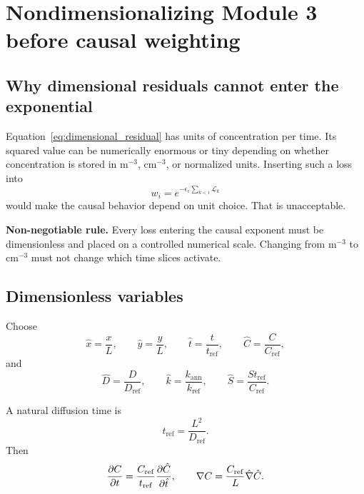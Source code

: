 \documentclass[11pt]{article}
\newcommand{\Dref}{D_{\mathrm{ref}}}
\newcommand{\kref}{k_{\mathrm{ref}}}
\newcommand{\Cref}{C_{\mathrm{ref}}}
\newcommand{\tref}{t_{\mathrm{ref}}}
\newcommand{\epsc}{\epsilon_{\mathrm{c}}}
\begin{document}
\section{Nondimensionalizing Module 3 before causal weighting}

\subsection{Why dimensional residuals cannot enter the exponential}

Equation~\eqref{eq:dimensional_residual} has units of concentration per time. Its squared value can be numerically enormous or tiny depending on whether concentration is stored in m$^{-3}$, cm$^{-3}$, or normalized units. Inserting such a loss into
\begin{equation}
w_i=e^{-\epsc\sum_{k<i}\mathcal{L}_k}
\end{equation}
would make the causal behavior depend on unit choice. That is unacceptable.

\begin{physicsbox}
\textbf{Non-negotiable rule.} Every loss entering the causal exponent must be dimensionless and placed on a controlled numerical scale. Changing from m$^{-3}$ to cm$^{-3}$ must not change which time slices activate.
\end{physicsbox}

\subsection{Dimensionless variables}

Choose
\begin{equation}
\hat{x}=\frac{x}{L},
\qquad
\hat{y}=\frac{y}{L},
\qquad
\hat{t}=\frac{t}{\tref},
\qquad
\hat{C}=\frac{C}{\Cref},
\end{equation}
and
\begin{equation}
\hat{D}=\frac{D}{\Dref},
\qquad
\hat{k}=\frac{k_{\mathrm{ann}}}{\kref},
\qquad
\hat{S}=\frac{S\tref}{\Cref}.
\end{equation}

A natural diffusion time is
\begin{equation}
\tref=\frac{L^2}{\Dref}.
\label{eq:diffusion_time}
\end{equation}
Then
\begin{equation}
\pdv{C}{t}
=
\frac{\Cref}{\tref}
\pdv{\hat{C}}{\hat{t}},
\qquad
\nabla C
=
\frac{\Cref}{L}\hat{\nabla}\hat{C}.
\end{equation}
\end{document}
